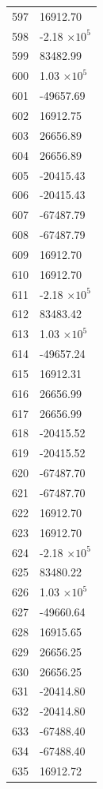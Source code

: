 \documentclass[a4paper,11pt]{article}
\begin{document}
\begin{center}
\begin{longtable}{|R{1.5cm}|R{2.6cm}|}
  597 &     16912.70 \\
  598 &        -2.18 $\times 10^{           5}$ \\
  599 &     83482.99 \\
  600 &         1.03 $\times 10^{           5}$ \\
  601 &    -49657.69 \\
  602 &     16912.75 \\
  603 &     26656.89 \\
  604 &     26656.89 \\
  605 &    -20415.43 \\
  606 &    -20415.43 \\
  607 &    -67487.79 \\
  608 &    -67487.79 \\
  609 &     16912.70 \\
  610 &     16912.70 \\
  611 &        -2.18 $\times 10^{           5}$ \\
  612 &     83483.42 \\
  613 &         1.03 $\times 10^{           5}$ \\
  614 &    -49657.24 \\
  615 &     16912.31 \\
  616 &     26656.99 \\
  617 &     26656.99 \\
  618 &    -20415.52 \\
  619 &    -20415.52 \\
  620 &    -67487.70 \\
  621 &    -67487.70 \\
  622 &     16912.70 \\
  623 &     16912.70 \\
  624 &        -2.18 $\times 10^{           5}$ \\
  625 &     83480.22 \\
  626 &         1.03 $\times 10^{           5}$ \\
  627 &    -49660.64 \\
  628 &     16915.65 \\
  629 &     26656.25 \\
  630 &     26656.25 \\
  631 &    -20414.80 \\
  632 &    -20414.80 \\
  633 &    -67488.40 \\
  634 &    -67488.40 \\
  635 &     16912.72 \\

\end{longtable}
\end{center}
\end{document}
